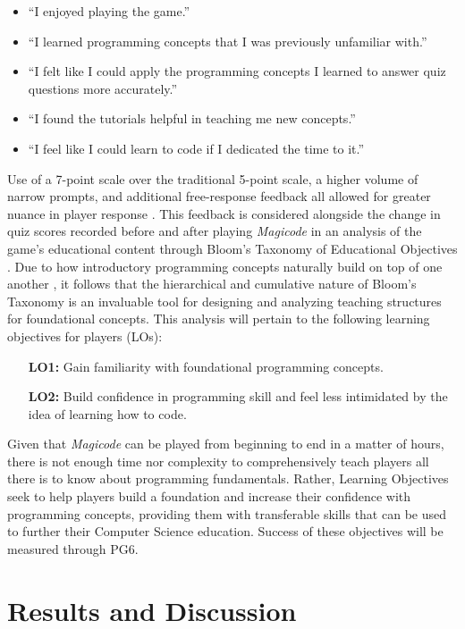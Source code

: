 \documentclass[10pt,twocolumn]{article}
\begin{document}
\begin{itemize}
    \item “I enjoyed playing the game.”
    \item “I learned programming concepts that I was previously unfamiliar with.”
    \item “I felt like I could apply the programming concepts I learned to answer quiz questions more accurately.”
    \item “I found the tutorials helpful in teaching me new concepts.”
    \item “I feel like I could learn to code if I dedicated the time to it.”
\end{itemize}

Use of a 7-point scale over the traditional 5-point scale, a higher volume of narrow prompts, and additional free-response feedback all allowed for greater nuance in player response \cite{likert-explored}. This feedback is considered alongside the change in quiz scores recorded before and after playing \textit{Magicode} in an analysis of the game’s educational content through Bloom’s Taxonomy of Educational Objectives \cite{bloom-taxonomy}. Due to how introductory programming concepts naturally build on top of one another \cite{teaching-oop}, it follows that the hierarchical and cumulative nature of Bloom’s Taxonomy is an invaluable tool for designing and analyzing teaching structures for foundational concepts. This analysis will pertain to the following learning objectives for players (LOs):

\begin{itemize}[leftmargin=.5in]
    \item[\textbf{LO1:}] Gain familiarity with foundational programming concepts.
    \item[\textbf{LO2:}] Build confidence in programming skill and feel less intimidated by the idea of learning how to code.
\end{itemize}

Given that \textit{Magicode} can be played from beginning to end in a matter of hours, there is not enough time nor complexity to comprehensively teach players all there is to know about programming fundamentals. Rather, Learning Objectives seek to help players build a foundation and increase their confidence with programming concepts, providing them with transferable skills that can be used to further their Computer Science education. Success of these objectives will be measured through PG6.


\section{Results and Discussion}
\end{document}
